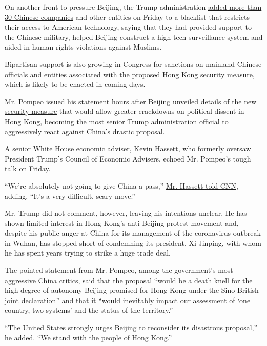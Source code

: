 On another front to pressure Beijing, the Trump administration
\href{https://www.commerce.gov/news/press-releases/2020/05/commerce-department-add-nine-chinese-entities-related-human-rights}{added
more than}
\href{https://www.commerce.gov/news/press-releases/2020/05/commerce-department-add-two-dozen-chinese-companies-ties-wmd-and}{30
Chinese companies} and other entities on Friday to a blacklist that
restricts their access to American technology, saying that they had
provided support to the Chinese military, helped Beijing construct a
high-tech surveillance system and aided in human rights violations
against Muslims.

Bipartisan support is also growing in Congress for sanctions on mainland
Chinese officials and entities associated with the proposed Hong Kong
security measure, which is likely to be enacted in coming days.

Mr. Pompeo issued his statement hours after Beijing
\href{https://www.nytimes3xbfgragh.onion/2020/05/22/business/china-hong-kong-national-security.html}{unveiled
details of the new security measure} that would allow greater crackdowns
on political dissent in Hong Kong, becoming the most senior Trump
administration official to aggressively react against China's drastic
proposal.

A senior White House economic adviser, Kevin Hassett, who formerly
oversaw President Trump's Council of Economic Advisers, echoed Mr.
Pompeo's tough talk on Friday.

``We're absolutely not going to give China a pass,''
\href{https://twitter.com/jimsciutto/status/1263829250785923073}{Mr.
Hassett told CNN}, adding, ``It's a very difficult, scary move.''

Mr. Trump did not comment, however, leaving his intentions unclear. He
has shown limited interest in Hong Kong's anti-Beijing protest movement
and, despite his public anger at China for its management of the
coronavirus outbreak in Wuhan, has stopped short of condemning its
president, Xi Jinping, with whom he has spent years trying to strike a
huge trade deal.

The pointed statement from Mr. Pompeo, among the government's most
aggressive China critics, said that the proposal ``would be a death
knell for the high degree of autonomy Beijing promised for Hong Kong
under the Sino-British joint declaration'' and that it ``would
inevitably impact our assessment of `one country, two systems' and the
status of the territory.''

``The United States strongly urges Beijing to reconsider its disastrous
proposal,'' he added. ``We stand with the people of Hong Kong.''

